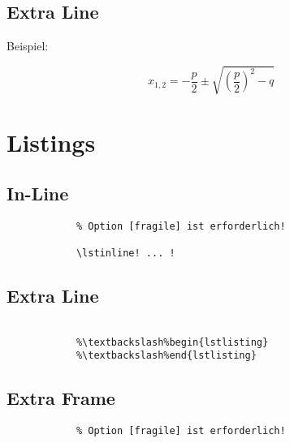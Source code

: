 	\subsection{Extra Line}
	\begin{frame}{\subsecname}

		Beispiel:

		\begin{equation*}
			x_{1,2} = -\frac{p}{2} \pm \sqrt{ \left( \frac{p}{2} \right)^2 - q }
		\end{equation*}

	\end{frame}

\section{Listings}

	\subsection{In-Line}
	\begin{frame}[fragile]{\subsecname}

		\begin{lstlisting}
			% Option [fragile] ist erforderlich!

			\lstinline! ... !
		\end{lstlisting}

	\end{frame}

	\subsection{Extra Line}
	\begin{frame}[fragile]{\subsecname}

		\begin{lstlisting}[escapechar=\%]
			%\%% Option [fragile] ist erforderlich!

			%\textbackslash%begin{lstlisting}
			%\textbackslash%end{lstlisting}
		\end{lstlisting}

	\end{frame}

	\subsection{Extra Frame}
	\begin{frame}[fragile]{\subsecname}

		\begin{lstlisting}
			% Option [fragile] ist erforderlich!

			
		\end{lstlisting}

	\end{frame}

